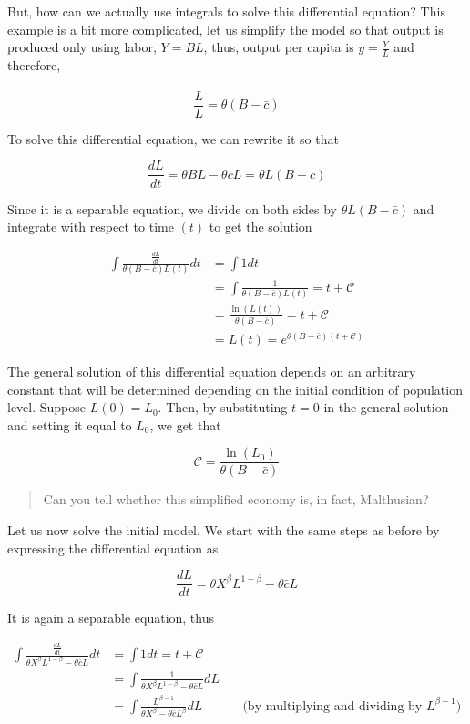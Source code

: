\documentclass[11pt]{article}
\begin{document}
But, how can we actually use integrals to solve this differential
equation? This example is a bit more complicated, let us simplify the
model so that output is produced only using labor, \(Y = B L\), thus,
output per capita is \(y = \frac{Y}{L}\) and therefore,

\[
\frac{\dot{L}}{L} = \theta\left(B - \bar{c}\right)
\]

To solve this differential equation, we can rewrite it so that

\[
\frac{dL}{dt} = \theta BL - \theta \bar{c} L = \theta L\left(B-\bar{c}\right)
\]

Since it is a separable equation, we divide on both sides by
\(\theta L\left(B-\bar{c}\right)\) and integrate with respect to time
\((t)\) to get the solution

\begin{align}
\int \frac{\frac{dL}{dt}}{\theta\left(B-\bar{c}\right)L(t)} dt & = \int 1 dt \\
&= \int\frac{1}{\theta\left(B-\bar{c}\right)L(t)} = t + \mathcal{C} \\
&= \frac{\ln(L(t))}{\theta\left(B-\bar{c}\right)} = t + \mathcal{C} \\
&= L(t) = e^{\theta\left(B-\bar{c}\right)\left(t+\mathcal{C}\right)}
\end{align}

The general solution of this differential equation depends on an
arbitrary constant that will be determined depending on the initial
condition of population level. Suppose \(L(0) = L_0\). Then, by
substituting \(t = 0\) in the general solution and setting it equal to
\(L_0\), we get that

\[
\mathcal{C} = \frac{\ln\left(L_0\right)}{\theta\left(B-\bar{c}\right)}
\]

\begin{quote}
Can you tell whether this simplified economy is, in fact, Malthusian?
\end{quote}

    Let us now solve the initial model. We start with the same steps as
before by expressing the differential equation as

\[
\frac{dL}{dt} = \theta X^{\beta}L^{1-\beta} - \theta\bar{c}L
\]

It is again a separable equation, thus

\begin{align}
\int \frac{\frac{dL}{dt}}{\theta X^{\beta}L^{1-\beta} - \theta\bar{c}L} dt &= \int 1 dt = t+\mathcal{C} & \ & \\
&= \int \frac{1}{\theta X^{\beta}L^{1-\beta} - \theta\bar{c}L} dL & \ & \\
&= \int \frac{L^{\beta-1}}{\theta X^{\beta} - \theta\bar{c}L^{\beta}} dL & \ & \text{(by multiplying and dividing by $L^{\beta-1}$)}
\end{align}
\end{document}
